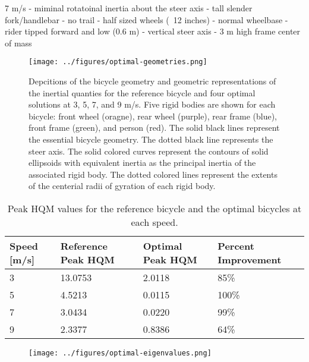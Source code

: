 \documentclass{bmd2019a}
\begin{document}
7 m/s
- miminal rotatoinal inertia about the steer axis
- tall slender fork/handlebar
- no trail
- half sized wheels (~12 inches)
- normal wheelbase
- rider tipped forward and low (0.6 m)
- vertical steer axis
- 3 m high frame center of mass
%
\begin{figure}
  \centering
  \texttt{[image: ../figures/optimal-geometries.png]}
  \caption{Depcitions of the bicycle geometry and geometric representations of
    the inertial quanties for the reference bicycle and four optimal solutions
    at 3, 5, 7, and 9 m/s. Five rigid bodies are shown for each bicycle: front
    wheel (oragne), rear wheel (purple), rear frame (blue), front frame
    (green), and person (red). The solid black lines represent the essential
    bicycle geometry. The dotted black line represents the steer axis. The
    solid colored curves represent the contours of solid ellipsoids with
    equivalent inertia as the principal inertia of the associated rigid body.
    The dotted colored lines represent the extents of the centerial radii of
    gyration of each rigid body.}
\end{figure}
%
\begin{table}
  \caption{Peak HQM values for the reference bicycle and the optimal bicycles
    at each speed.}
  \label{tab:hqm}
  \centering
  \begin{tabular}{llll}
    \toprule
    Speed [m/s] & Reference Peak HQM & Optimal Peak HQM & Percent Improvement \\
    \midrule
    3 & 13.0753 & 2.0118 & 85\% \\
    5 & 4.5213  & 0.0115 & 100\% \\
    7 & 3.0434  & 0.0220 &  99\% \\
    9 & 2.3377  & 0.8386 &  64\% \\
    \bottomrule
  \end{tabular}
\end{table}
%
\begin{figure}
  \centering
  \texttt{[image: ../figures/optimal-eigenvalues.png]}
  \caption{}
\end{figure}
%
\end{document}
